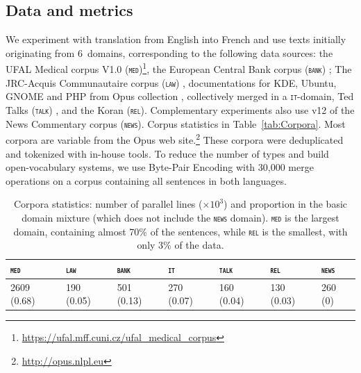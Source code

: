 \documentclass[11pt,a4paper]{article}
\newcommand{\domain}[1]{\texttt{\textsc{#1}}}
\begin{document}
\subsection{Data and metrics \label{ssec:corpora}}
We experiment with translation from English into French and use texts initially originating from 6~domains, corresponding to the following data sources: the UFAL Medical corpus V1.0 (\domain{med})\footnote{\url{https://ufal.mff.cuni.cz/ufal_medical_corpus}}, the European Central Bank corpus (\domain{bank}) \cite{Tiedemann12parallel}; The JRC-Acquis Communautaire corpus (\domain{law}) \cite{Steinberger06acquis}, documentations for KDE, Ubuntu, GNOME and PHP from Opus collection \cite{Tiedemann09news}, collectively merged in a \domain{it}-domain, Ted Talks (\domain{talk}) \cite{Cettolo12wit}, and the Koran (\domain{rel}). Complementary experiments also use v12 of the News Commentary corpus (\domain{news}). Corpus statistics in Table~\ref{tab:Corpora}.  Most corpora are variable from the Opus web site.\footnote{\url{http://opus.nlpl.eu}} These corpora were deduplicated and tokenized with in-house tools. To reduce the number of types and build open-vocabulary systems, we use Byte-Pair Encoding \cite{Sennrich16BPE} with 30,000 merge operations on a corpus containing all sentences in both languages.%

\begin{table}[htbp]
  \centering
  \begin{tabular}{ |lllllll|} %
    \hline
    \domain{med} & \domain{law} & \domain{bank} & \domain{it} & \domain{talk} & \domain{rel} & \domain{news} \\
    \hline
    2609 (0.68) & 190 (0.05)  & 501 (0.13) & 270 (0.07) & 160 (0.04) & 130 (0.03) & 260 (0) \\
    \hline
  \end{tabular}
\caption{Corpora statistics: number of parallel lines ($\times 10^3$) and proportion in the basic domain mixture (which does not include the \domain{news} domain). \domain{med} is the largest domain, containing almost 70\% of the sentences, while \domain{rel} is the smallest, with only 3\% of the data.}
\label{tab:Corpora-en-fr}
\end{table}
\end{document}
